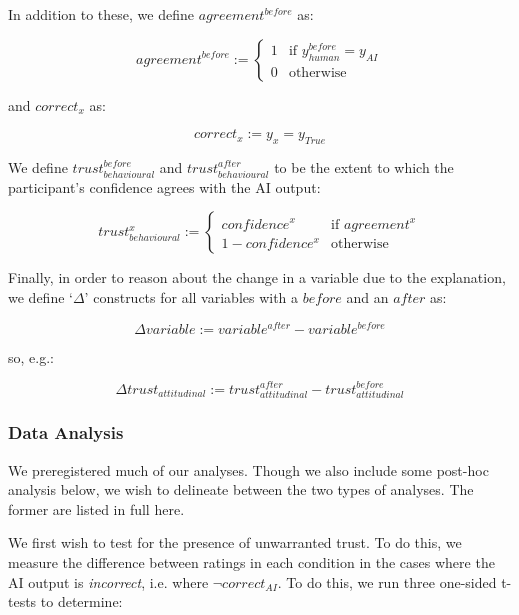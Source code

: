 In addition to these, we define $agreement^{before}$ as:

\begin{equation}
    agreement^{before} := \begin{cases}
        1 & \text{if } y_{human}^{before} = y_{AI} \\
        0 & \text{otherwise}
    \end{cases}
\end{equation}

\noindent and $correct_{x}$ as:

\begin{equation}
    correct_{x} := y_{x} = y_{True}
\end{equation}

We define $trust_{behavioural}^{before}$ and $trust_{behavioural}^{after}$ to be the extent to which the participant's confidence agrees with the AI output:

\begin{equation}
    trust_{behavioural}^{x} := \begin{cases}
        confidence^{x}      & \text{if } agreement^{x} \\
        1-confidence^{x}    & \text{otherwise}
    \end{cases}
\end{equation}

Finally, in order to reason about the change in a variable due to the explanation, we define `$\Delta$' constructs for all variables with a $before$ and an $after$ as:

\begin{equation}
    \Delta variable := variable^{after} - variable^{before}
\end{equation}

\noindent so, e.g.:

\begin{equation}
    \Delta trust_{attitudinal} := trust_{attitudinal}^{after} - trust_{attitudinal}^{before}
\end{equation}

\subsubsection{Data Analysis}
We preregistered much of our analyses. Though we also include some post-hoc analysis below, we wish to delineate between the two types of analyses. The former are listed in full here.

We first wish to test for the presence of unwarranted trust. To do this, we measure the difference between ratings in each condition in the cases where the AI output is \textit{incorrect}, i.e. where $\neg correct_{AI}$. To do this, we run three one-sided t-tests \cite{Caldwell-et-al} to determine:

